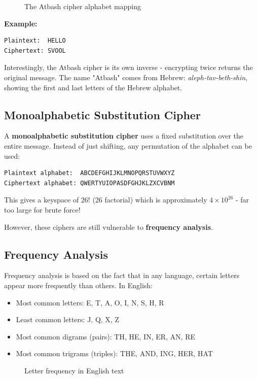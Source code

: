 \documentclass[11pt,a4paper]{report}
\begin{document}
\begin{figure}[h]
\caption{The Atbash cipher alphabet mapping}
\end{figure}

\textbf{Example:}
\begin{verbatim}
Plaintext:  HELLO
Ciphertext: SVOOL
\end{verbatim}

Interestingly, the Atbash cipher is its own inverse - encrypting twice returns the original message. The name "Atbash" comes from Hebrew: \emph{aleph-tav-beth-shin}, showing the first and last letters of the Hebrew alphabet.

\subsection{Monoalphabetic Substitution Cipher}

A \textbf{monoalphabetic substitution cipher} uses a fixed substitution over the entire message. Instead of just shifting, any permutation of the alphabet can be used:

\begin{verbatim}
Plaintext alphabet:  ABCDEFGHIJKLMNOPQRSTUVWXYZ
Ciphertext alphabet: QWERTYUIOPASDFGHJKLZXCVBNM
\end{verbatim}

This gives a keyspace of $26!$ (26 factorial) which is approximately $4 \times 10^{26}$ - far too large for brute force!

However, these ciphers are still vulnerable to \textbf{frequency analysis}.

\subsection{Frequency Analysis}

Frequency analysis is based on the fact that in any language, certain letters appear more frequently than others. In English:
\begin{itemize}
\item Most common letters: E, T, A, O, I, N, S, H, R
\item Least common letters: J, Q, X, Z
\item Most common digrams (pairs): TH, HE, IN, ER, AN, RE
\item Most common trigrams (triples): THE, AND, ING, HER, HAT
\end{itemize}

\begin{figure}[h]
\caption{Letter frequency in English text}
\end{figure}
\end{document}
